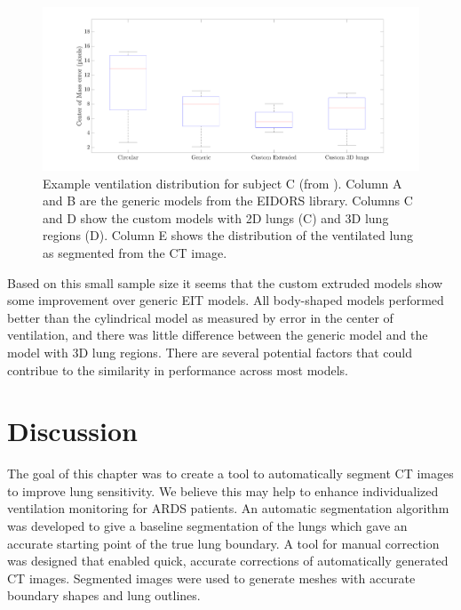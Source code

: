 \begin{figure}
	\centering
	\includegraphics[width=\textwidth]{chapter5-CT_to_mesh/imgs/error_boxplot.pdf}
	\caption[Example ventilation distributions]{\label{fig:c-of-m-error}%
	Example ventilation distribution for subject C (from ).
	Column A and B are the generic models from the EIDORS library. 
	Columns C and D show the custom models with 2D lungs (C) and 3D lung regions (D).
	Column E shows the distribution of the ventilated lung as segmented from the CT image. 
	}
\end{figure}

Based on this small sample size it seems that the custom extruded models show some improvement 
over generic EIT models. 
All body-shaped models performed better than the cylindrical model 
as measured by error in the center of ventilation,
and there was little difference between the generic model and the model with 3D lung regions. 
There are several potential factors that could contribue to the similarity in performance across
most models. 

\section{Discussion}
The goal of this chapter was to create a tool to automatically segment CT images 
to improve lung sensitivity. 
We believe this may help to enhance individualized ventilation monitoring for ARDS patients. 
An automatic segmentation algorithm was developed to give a baseline segmentation of the lungs which 
gave an accurate starting point of the true lung boundary. A tool for manual correction was designed 
that enabled quick, accurate corrections of automatically generated CT images. 
Segmented images were used to generate meshes with accurate boundary  shapes and lung outlines. 

